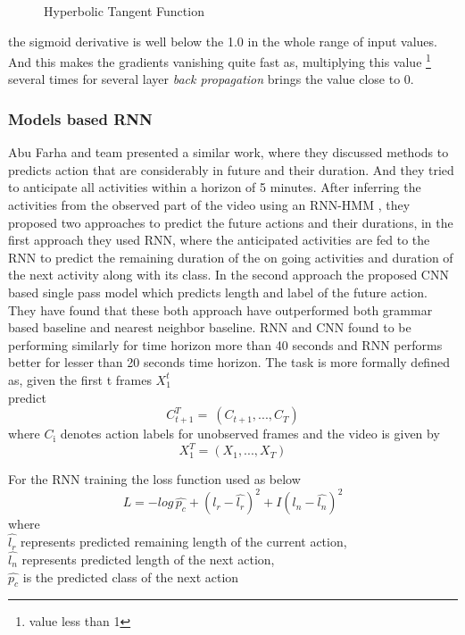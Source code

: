 \begin{figure}[h]
	\centering
	\caption{Hyperbolic Tangent Function}
	\label{fig:tanh-function}
\end{figure}


the sigmoid derivative is well below the 1.0 in the whole range of input values. And this makes the gradients vanishing quite fast as, multiplying this value \footnote{value less than 1} several times for several layer \textit{ back propagation} brings the value close to 0.

\subsubsection{Models based RNN }
\newpara Abu Farha and team presented \cite{abu2018will} a similar work, where they discussed methods to predicts action that are considerably in future and their duration. And they tried to anticipate all activities within a horizon of 5 minutes. After inferring the activities from the observed part of the video using an RNN-HMM \cite{richard2017weakly}, they proposed two approaches to predict the future actions and their durations, in the first approach they used RNN, where the anticipated activities are fed to the RNN to predict the remaining duration of the on going activities and duration of the next activity along with its class.
In the second approach the proposed CNN based single pass model which predicts length and label of the future action. They have found that these both approach have outperformed both grammar based baseline and nearest neighbor baseline. RNN and CNN found to be performing similarly for time horizon more than 40 seconds and RNN performs better for lesser than 20 seconds time horizon. The task is more formally defined as,
given the first t frames $X_{\text{1}}^t$ \\
predict \[ C_{t+1}^T  = \ (C_{t+1}, ..., C_{T}) \]
where $C_{\text{i}}$ denotes action labels for unobserved frames
and the video is given by
\[ X_{1}^T = (X_{1}, ..., X_{T}) \]

\newpara
For the RNN training the loss function used as below
\begin{equation}
    L = -log\, \hat{p_c} + (l_r - \hat{l_r})^2 +  I (l_n - \hat{l_n})^2 
\end{equation}
where \\
$\hat{l_r}$ represents predicted remaining length of the current action, \\
$\hat{l_n}$ represents predicted length of the next action, \\
$\hat{p_c}$ is the predicted class of the next action

